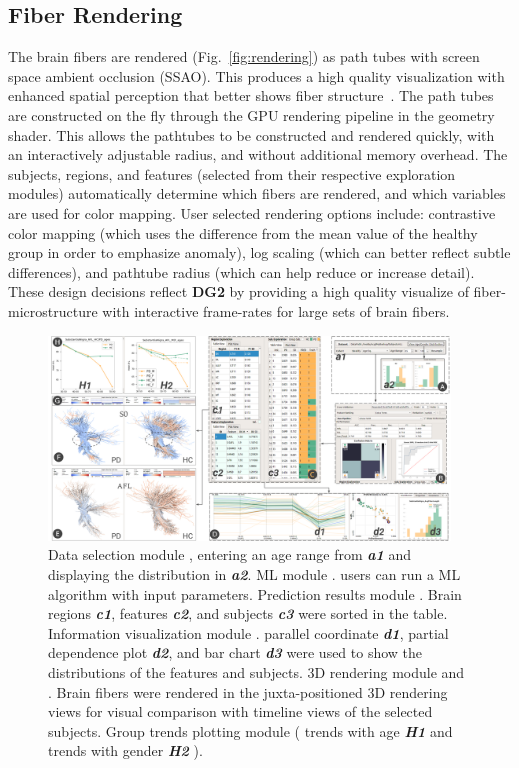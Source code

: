 \subsection{Fiber Rendering}
\label{sec:rendering}

\noindent The brain fibers are rendered (Fig.~\ref{fig:rendering}) as path tubes with screen space ambient occlusion (SSAO). This produces a high quality visualization with enhanced spatial perception that better shows fiber structure~\cite{mittring2007finding, eichelbaum2013lineao}. The path tubes are constructed on the fly through the GPU rendering pipeline in the geometry shader. This allows the pathtubes to be constructed and rendered quickly, with an interactively adjustable radius, and without additional memory overhead. The subjects, regions, and features (selected from their respective exploration modules) automatically determine which fibers are rendered, and which variables are used for color mapping.  User selected rendering options include: contrastive color mapping (which uses the difference from the mean value of the healthy group in order to emphasize anomaly), log scaling (which can better reflect subtle differences), and pathtube radius (which can help reduce or increase detail). These design decisions reflect \textbf{DG2} by providing a high quality visualize of fiber-microstructure with interactive frame-rates for large sets of brain fibers. 


\begin{figure}[t!]
\centering
\includegraphics[width=0.95\textwidth]{images/SNSteps_v5.png}%
\caption{ Data selection module , entering an age range from \textbf{\textit{a1}} and displaying the distribution in \textbf{\textit{a2}}. ML module . users can run a ML algorithm with input parameters. Prediction results module . Brain regions \textbf{\textit{c1}}, features \textbf{\textit{c2}}, and subjects \textbf{\textit{c3}} were sorted in the table. Information visualization module . parallel coordinate \textbf{\textit{d1}}, partial dependence plot \textbf{\textit{d2}}, and bar chart \textbf{\textit{d3}} were used to show the distributions of the features and subjects. 3D rendering module  and . Brain fibers were rendered in the juxta-positioned 3D rendering views for visual comparison with timeline views   of the selected subjects. Group trends plotting module  ( trends with age \textbf{\textit{H1}} and trends with gender \textbf{\textit{H2}} ).}
\label{fig:SNSteps}
\end{figure}



